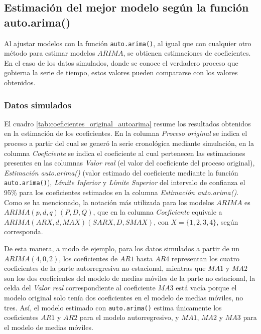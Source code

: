 \documentclass[
]{article}
\begin{document}
\subsection{Estimación del mejor modelo según la función auto.arima()}

Al ajustar modelos con la función \texttt{auto.arima()}, al igual que
con cualquier otro método para estimar modelos \(ARIMA\), se obtienen
estimaciones de coeficientes. En el caso de los datos simulados, donde
se conoce el verdadero proceso que gobierna la serie de tiempo, estos
valores pueden compararse con los valores obtenidos.

\subsubsection{Datos simulados}

El cuadro \ref{tab:coeficientes_original_autoarima} resume los
resultados obtenidos en la estimación de los coeficientes. En la columna
\emph{Proceso original} se indica el proceso a partir del cual se generó
la serie cronológica mediante simulación, en la columna
\emph{Coeficiente} se indica el coeficiente al cual pertenecen las
estimaciones presentes en las columnas \emph{Valor real} (el valor del
coeficiente del proceso original), \emph{Estimación auto.arima()} (valor
estimado del coeficiente mediante la función \texttt{auto.arima()}),
\emph{Límite Inferior} y \emph{Límite Superior} del intervalo de
confianza el 95\% para los coeficientes estimados en la columna
\emph{Estimación auto.arima()}. Como se ha mencionado, la notación más
utilizada para los modelos \(ARIMA\) es \(ARIMA(p,d,q)(P,D,Q)\), que en
la columna \emph{Coeficiente} equivale a
\(ARIMA(ARX, d, MAX)(SARX, D, SMAX)\), con \(X=\{1,2,3,4\}\), según
corresponda.

De esta manera, a modo de ejemplo, para los datos simulados a partir de
un \(ARIMA(4,0,2)\), los coeficientes de \(AR1\) hasta \(AR4\)
representan los cuatro coeficientes de la parte autorregresiva no
estacional, mientras que \(MA1\) y \(MA2\) son los dos coeficientes del
modelo de medias móviles de la parte no estacional, la celda del
\emph{Valor real} correspondiente al coeficiente \(MA3\) está vacía
porque el modelo original solo tenía dos coeficientes en el modelo de
medias móviles, no tres. Así, el modelo estimado con
\texttt{auto.arima()} estima únicamente los coeficientes \(AR1\) y
\(AR2\) para el modelo autorregresivo, y \(MA1\), \(MA2\) y \(MA3\) para
el modelo de medias móviles.
\end{document}

